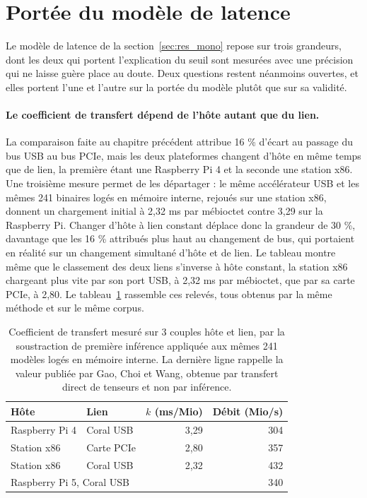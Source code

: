 \documentclass[11pt,a4paper]{report}
\begin{document}
\section{Portée du modèle de latence}
\label{sec:persp_modele}

Le modèle de latence de la section~\ref{sec:res_mono} repose sur trois grandeurs, dont les deux qui portent l'explication du seuil sont mesurées avec une précision qui ne laisse guère place au doute. Deux questions restent néanmoins ouvertes, et elles portent l'une et l'autre sur la portée du modèle plutôt que sur sa validité.

\paragraph{Le coefficient de transfert dépend de l'hôte autant que du lien.} La comparaison faite au chapitre précédent attribue 16 \% d'écart au passage du bus USB au bus PCIe, mais les deux plateformes changent d'hôte en même temps que de lien, la première étant une Raspberry Pi 4 et la seconde une station x86. Une troisième mesure permet de les départager : le même accélérateur USB et les mêmes 241 binaires logés en mémoire interne, rejoués sur une station x86, donnent un chargement initial à 2,32 ms par mébioctet contre 3,29 sur la Raspberry Pi. Changer d'hôte à lien constant déplace donc la grandeur de 30 \%, davantage que les 16 \% attribués plus haut au changement de bus, qui portaient en réalité sur un changement simultané d'hôte et de lien. Le tableau montre même que le classement des deux liens s'inverse à hôte constant, la station x86 chargeant plus vite par son port USB, à 2,32 ms par mébioctet, que par sa carte PCIe, à 2,80. Le tableau~\ref{tab:kplateformes} rassemble ces relevés, tous obtenus par la même méthode et sur le même corpus.

\begin{table}[H]
\centering\small
\caption[Coefficient de transfert selon la plateforme]{Coefficient de transfert mesuré sur 3 couples hôte et lien, par la soustraction de première inférence appliquée aux mêmes 241 modèles logés en mémoire interne. La dernière ligne rappelle la valeur publiée par Gao, Choi et Wang, obtenue par transfert direct de tenseurs et non par inférence.}
\label{tab:kplateformes}
\begin{tabular}{llrr}
\toprule
Hôte & Lien & $k$ (ms/Mio) & Débit (Mio/s) \\
\midrule
Raspberry Pi 4 & Coral USB   & 3,29 & 304 \\
Station x86    & Carte PCIe  & 2,80 & 357 \\
Station x86    & Coral USB   & 2,32 & 432 \\
\midrule
\multicolumn{2}{l}{Raspberry Pi 5, Coral USB \cite{gaoWorkInProgressModeling2025}} & & 340 \\
\bottomrule
\end{tabular}
\end{table}
\end{document}
